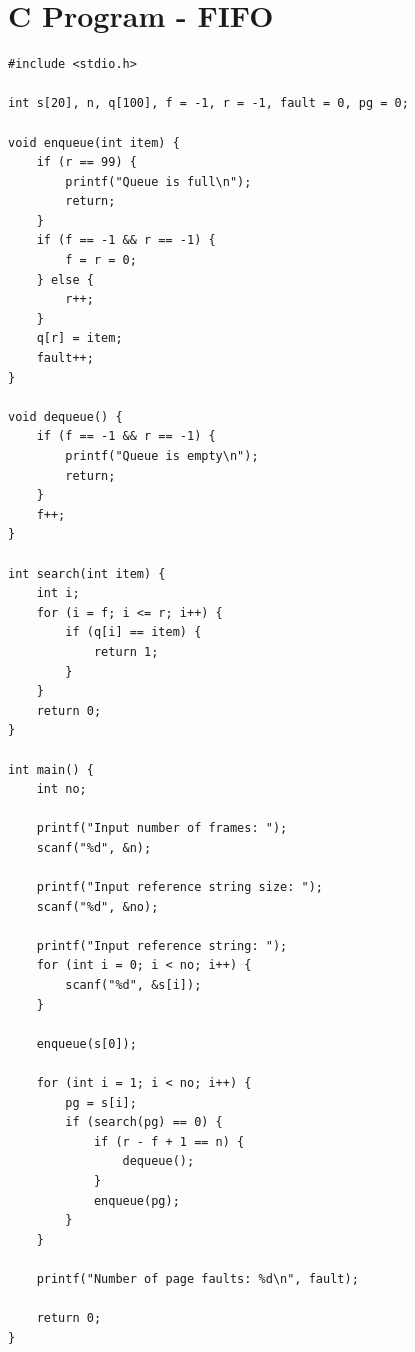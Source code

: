 \section{C Program - FIFO}
\begin{lstlisting}[label={list:c_program:queue}]
#include <stdio.h>

int s[20], n, q[100], f = -1, r = -1, fault = 0, pg = 0;

void enqueue(int item) {
    if (r == 99) {
        printf("Queue is full\n");
        return;
    }
    if (f == -1 && r == -1) {
        f = r = 0;
    } else {
        r++;
    }
    q[r] = item;
    fault++;
}

void dequeue() {
    if (f == -1 && r == -1) {
        printf("Queue is empty\n");
        return;
    }
    f++;
}

int search(int item) {
    int i;
    for (i = f; i <= r; i++) {
        if (q[i] == item) {
            return 1;
        }
    }
    return 0;
}

int main() {
    int no;

    printf("Input number of frames: ");
    scanf("%d", &n);

    printf("Input reference string size: ");
    scanf("%d", &no);

    printf("Input reference string: ");
    for (int i = 0; i < no; i++) {
        scanf("%d", &s[i]);
    }

    enqueue(s[0]);

    for (int i = 1; i < no; i++) {
        pg = s[i];
        if (search(pg) == 0) {
            if (r - f + 1 == n) {
                dequeue();
            }
            enqueue(pg);
        }
    }

    printf("Number of page faults: %d\n", fault);

    return 0;
}
\end{lstlisting}

